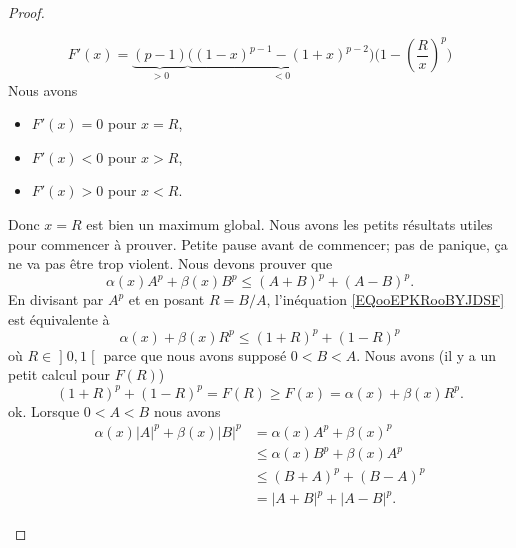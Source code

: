 \begin{proof}
\begin{subproof}
        \begin{equation}
            F'(x)=\underbrace{(p-1)}_{>0}\underbrace{\Big( (1-x)^{p-1}-(1+x)^{p-2} \Big)}_{<0}\Big( 1-\left( \frac{ R }{ x } \right)^p \Big)
        \end{equation}
        Nous avons
        \begin{itemize}
            \item \( F'(x)=0\) pour \( x=R\),
            \item \( F'(x)<0\) pour \( x>R\),
            \item \( F'(x)>0\) pour \( x<R\).
        \end{itemize}
        Donc \( x=R\) est bien un maximum global.
        \spitem[Pause]
        Nous avons les petits résultats utiles pour commencer à prouver. Petite pause avant de commencer; pas de panique, ça ne va pas être trop violent.
        \spitem[Pour \( 0<B<A\)]
        Nous devons prouver que
        \begin{equation}        \label{EQooEPKRooBYJDSF}
            \alpha(x)A^p+\beta(x)B^p\leq (A+B)^p+(A-B)^p.
        \end{equation}
        En divisant par \( A^p\) et en posant \( R=B/A\), l'inéquation \eqref{EQooEPKRooBYJDSF} est équivalente à
        \begin{equation}
            \alpha(x)+\beta(x)R^p\leq (1+R)^p+(1-R)^p
        \end{equation}
        où \( R\in \mathopen] 0 , 1 \mathclose[\) parce que nous avons supposé \( 0<B<A\). Nous avons (il y a un petit calcul pour \( F(R)\))
        \begin{equation}
            (1+R)^p+(1-R)^p=F(R)\geq F(x)=\alpha(x)+\beta(x)R^p.
        \end{equation}
        ok.
        \spitem[Pour \( 0<A<B\)]
        Lorsque \( 0<A<B\) nous avons
        \begin{subequations}
            \begin{align}
                \alpha(x)| A |^p+\beta(x)| B |^p & =\alpha(x)A^p+\beta(x)^p                                       \\
                                                 & \leq \alpha(x)B^p+\beta(x)A^p      \label{SUBEQooSHNUooCoWMFB} \\
                                                 & \leq (B+A)^p+(B-A)^p       \label{SUBEQooBPYVooPsAjbq}         \\
                                                 & =| A+B |^p+| A-B |^p.
            \end{align}

\end{subequations}
\end{subproof}
\end{proof}
